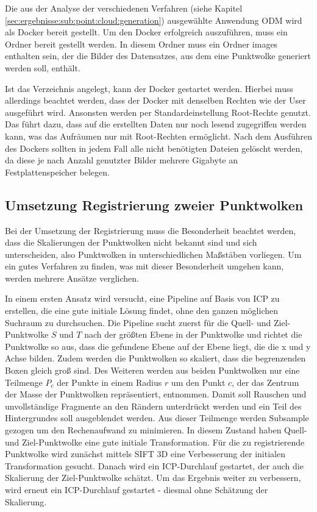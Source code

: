 \documentclass[12pt,titlepage, twoside]{article}
\begin{document}
Die aus der Analyse der verschiedenen Verfahren (siehe Kapitel \ref{sec:ergebnisse:sub:point:cloud:generation}) ausgewählte Anwendung ODM wird als Docker bereit gestellt. Um den Docker erfolgreich auszuführen, muss ein Ordner bereit gestellt werden.
In diesem Ordner muss ein Ordner \glqq images\grqq{} enthalten sein, der die Bilder des Datensatzes, aus dem eine Punktwolke generiert werden soll, enthält.

Ist das Verzeichnis angelegt, kann der Docker gestartet werden. Hierbei muss allerdings beachtet werden, dass der Docker mit denselben Rechten wie der User ausgeführt wird. 
Ansonsten werden per Standardeinstellung Root-Rechte genutzt.
Das führt dazu, dass auf die erstellten Daten nur noch lesend zugegriffen werden kann, was das Aufräumen nur mit Root-Rechten ermöglicht.
Nach dem Ausführen des Dockers sollten in jedem Fall alle nicht benötigten Dateien gelöscht werden, da diese je nach Anzahl genutzter Bilder mehrere Gigabyte an Festplattenspeicher belegen.

\subsection{Umsetzung Registrierung zweier Punktwolken}
\label{sec:realisierung:implementierung2}

Bei der Umsetzung der Registrierung muss die Besonderheit beachtet werden, dass die Skalierungen der Punktwolken nicht bekannt sind und sich unterscheiden, 
also Punktwolken in unterschiedlichen Maßstäben vorliegen. 
Um ein gutes Verfahren zu finden, was mit dieser Besonderheit umgehen kann, werden mehrere Ansätze verglichen.

In einem ersten Ansatz wird versucht, eine Pipeline auf Basis von ICP zu erstellen, die eine gute initiale Lösung findet, ohne den ganzen möglichen Suchraum zu durchsuchen.
Die Pipeline sucht zuerst für die Quell- und Ziel-Punktwolke $S$ und $T$ nach der größten Ebene in der Punktwolke und richtet die Punktwolke so aus, dass die gefundene Ebene auf der Ebene liegt, die die x und y Achse bilden.
Zudem werden die Punktwolken so skaliert, dass die begrenzenden Boxen gleich groß sind.
Des Weiteren werden aus beiden Punktwolken nur eine Teilmenge $P_c$ der Punkte in einem Radius $r$ um den Punkt $c$, der das Zentrum der Masse der Punktwolken repräsentiert, entnommen.
Damit soll Rauschen und unvollständige Fragmente an den Rändern unterdrückt werden und ein Teil des Hintergrundes soll ausgeblendet werden.
Aus dieser Teilmenge werden Subsample gezogen um den Rechenaufwand zu minimieren. In diesem Zustand haben Quell- und Ziel-Punktwolke eine gute initiale Transformation.
Für die zu registrierende Punktwolke wird zunächst mittels SIFT 3D \cite{Sift3D} eine Verbesserung der initialen Transformation gesucht. 
Danach wird ein ICP-Durchlauf gestartet, der auch die Skalierung der Ziel-Punktwolke schätzt.
Um das Ergebnis weiter zu verbessern, wird erneut ein ICP-Durchlauf gestartet - diesmal ohne Schätzung der Skalierung.
\end{document}
